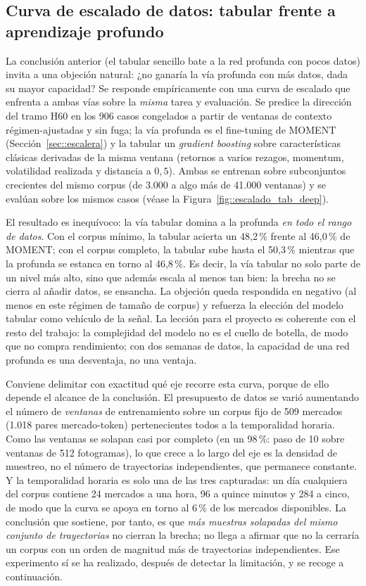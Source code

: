 \subsection{Curva de escalado de datos: tabular frente a aprendizaje profundo}
\label{sec::escalado_tab_deep}

La conclusión anterior (el tabular sencillo bate a la red profunda con pocos datos) invita
a una objeción natural: ¿no ganaría la vía profunda con más datos, dada su mayor capacidad?
Se responde empíricamente con una curva de escalado que enfrenta a ambas vías sobre la
\emph{misma} tarea y evaluación. Se predice la dirección del tramo H60 en los 906 casos
congelados a partir de ventanas de contexto régimen-ajustadas y sin fuga; la vía profunda
es el fine-tuning de MOMENT (Sección~\ref{sec::escalera}) y la tabular un \emph{gradient
boosting} sobre características clásicas derivadas de la misma ventana (retornos a varios
rezagos, momentum, volatilidad realizada y distancia a $0{,}5$). Ambas se entrenan sobre
subconjuntos crecientes del mismo corpus (de 3.000 a algo más de 41.000 ventanas) y se
evalúan sobre los mismos casos (véase la Figura~\ref{fig::escalado_tab_deep}).

El resultado es inequívoco: la vía tabular domina a la profunda \emph{en todo el rango de
datos}. Con el corpus mínimo, la tabular acierta un 48,2\,\% frente al 46,0\,\% de
MOMENT; con el corpus completo, la tabular sube hasta el 50,3\,\% mientras que la
profunda se estanca en torno al 46,8\,\%. Es decir, la vía tabular no solo parte de un
nivel más alto, sino que además escala al menos tan bien: la brecha no se cierra al añadir
datos, se ensancha. La objeción queda respondida en negativo (al menos en este régimen de
tamaño de corpus) y refuerza la elección del modelo tabular como vehículo de la señal. La
lección para el proyecto es coherente con el resto del trabajo: la complejidad del modelo
no es el cuello de botella, de modo que no compra rendimiento; con dos semanas de datos, la
capacidad de una red profunda es una desventaja, no una ventaja.

Conviene delimitar con exactitud qué eje recorre esta curva, porque de ello depende el
alcance de la conclusión. El presupuesto de datos se varió aumentando el número de
\emph{ventanas} de entrenamiento sobre un corpus fijo de 509 mercados (1.018 pares
mercado-token) pertenecientes todos a la temporalidad horaria. Como las ventanas se
solapan casi por completo (en un 98\,\%: paso de 10 sobre ventanas de 512 fotogramas), lo
que crece a lo largo del eje es la densidad de muestreo, no
el número de trayectorias independientes, que permanece constante. Y la temporalidad
horaria es solo una de las tres capturadas: un día cualquiera del corpus contiene 24
mercados a una hora, 96 a quince minutos y 284 a cinco, de modo que la curva se apoya en
torno al 6\,\% de los mercados disponibles. La conclusión que sostiene, por tanto, es que
\emph{más muestras solapadas del mismo conjunto de trayectorias} no cierran la brecha; no
llega a afirmar que no la cerraría un corpus con un orden de magnitud más de trayectorias
independientes. Ese experimento sí se ha realizado, después de detectar la limitación, y
se recoge a continuación.

